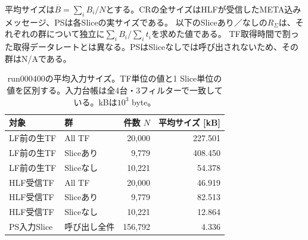 
平均サイズは$\overline{B}=\sum_i B_i/N$とする。CRの全サイズはHLFが受信したMETA込みメッセージ、PSは各Sliceの実サイズである。
以下のSliceあり／なしの$R_\Sigma$は、それぞれの群について独立に$\sum_i B_i/\sum_i t_i$を求めた値である。
TF取得時間で割った取得データレートとは異なる。PSはSliceなしでは呼び出されないため、その群はN/Aである。

\begin{table}[htbp]
 \centering
 \caption{run000400の平均入力サイズ。TF単位の値と1 Slice単位の値を区別する。入力台帳は全4台・3フィルターで一致している。kBは$10^3$ byte。}
 \begin{tabular}{llrr}\hline
 対象 & 群 & 件数 $N$ & 平均サイズ [kB] \\ \hline
 LF前の生TF & All TF & 20,000 & 227.501 \\
 LF前の生TF & Sliceあり & 9,779 & 408.450 \\
 LF前の生TF & Sliceなし & 10,221 & 54.378 \\
 HLF受信TF & All TF & 20,000 & 46.919 \\
 HLF受信TF & Sliceあり & 9,779 & 82.513 \\
 HLF受信TF & Sliceなし & 10,221 & 12.864 \\
 PS入力Slice & 呼び出し全件 & 156,792 & 4.336 \\
 \hline\end{tabular}
\end{table}

